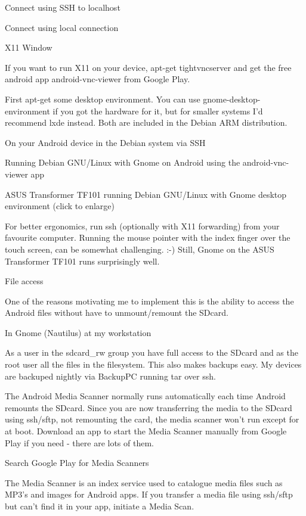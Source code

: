 Connect using SSH to localhost

Connect using local connection

X11 Window

If you want to run X11 on your device, apt-get tightvncserver and get the free
android app android-vnc-viewer from Google Play.

First apt-get some desktop environment. You can use gnome-desktop-environment if
you got the hardware for it, but for smaller systems I'd recommend lxde instead.
Both are included in the Debian ARM distribution.

On your Android device in the Debian system via SSH


Running Debian GNU/Linux with Gnome on Android using the android-vnc-viewer app

ASUS Transformer TF101 running Debian GNU/Linux with Gnome desktop environment
(click to enlarge)

For better ergonomics, run ssh (optionally with X11 forwarding) from your
favourite computer. Running the mouse pointer with the index finger over the
touch screen, can be somewhat challenging. :-) Still, Gnome on the ASUS
Transformer TF101 runs surprisingly well.

File access

One of the reasons motivating me to implement this is the ability to access the
Android files without have to unmount/remount the SDcard.

In Gnome (Nautilus) at my workstation

As a user in the sdcard\_rw group you have full access to the SDcard and as the
root user all the files in the filesystem. This also makes backups easy. My
devices are backuped nightly via BackupPC running tar over ssh.

The Android Media Scanner normally runs automatically each time Android remounts
the SDcard. Since you are now transferring the media to the SDcard using
ssh/sftp, not remounting the card, the media scanner won't run except for at
boot. Download an app to start the Media Scanner manually from Google Play if
you need - there are lots of them.

Search Google Play for Media Scanners

The Media Scanner is an index service used to catalogue media files such as
MP3's and images for Android apps. If you transfer a media file using ssh/sftp
but can't find it in your app, initiate a Media Scan.

